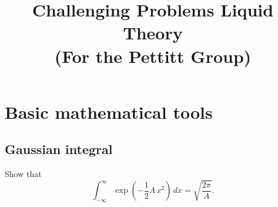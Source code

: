 \documentclass[12pt]{book}
\begin{document}
\newcommand{\problem}[1]{\section{#1}}
\newcommand{\hint}[1]{[\,\emph{Hint.} #1]}

\newcommand{\vct}[1]{\boldsymbol{\mathbf{#1}}}
\newcommand{\vr}{\vct{r}}
\newcommand{\vrN}{\vr^N}
\newcommand{\vrn}{\vr^n}
\newcommand{\dvr}{\frac{ d \vr  }{(2\pi)^3}}
\newcommand{\vx}{\vct{x}}
\newcommand{\vxN}{\vx^N}
\newcommand{\vxn}{\vx^n}
\newcommand{\dvx}{\frac{ d \vx  }{(2\pi)^3}}
\newcommand{\vk}{\vct{k}}
\newcommand{\dvk}{\frac{ d \vk  }{(2\pi)^3}}
\newcommand{\FT}[1]{\tilde{#1}}
\newcommand{\FTc}{\FT{c}}
\newcommand{\FTh}{\FT{h}}

\newcommand{\supex}[1]{ { { #1 }^{ \mathrm{ex} } } }
\newcommand{\Pex}{\supex{P}}
\newcommand{\Fex}{\supex{F}}
\newcommand{\muex}{\supex{\mu}}
\newcommand{\kex}{\supex{\kappa}}
\newcommand{\Chn}{\mathscr{C}}
\newcommand{\secref}[1]{Sec. \ref{#1}}

\newcommand{\llbra}{[\![}
\newcommand{\llket}{]\!]}

\newcommand{\plam}{\partial_\lambda}
\newcommand{\pbet}{\partial_\beta}



\title{Challenging Problems Liquid Theory \\
  (For the Pettitt Group)}
\date{}
\maketitle

\tableofcontents



\chapter{Basic mathematical tools}


\problem{Gaussian integral}

Show that
\begin{equation}
  \int_{-\infty}^{\infty}
    \exp\left( -\frac{1}{2} A \, x^2 \right) \, dx
  =
  \sqrt{ \frac{ 2 \pi }{ A } }.
  \label{eq:GaussianIntegral}
\end{equation}
\end{document}
